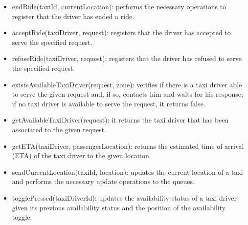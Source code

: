 \begin{itemize}
\begin{itemize}
	\item endRide(taxiId, currentLocation): performs the necessary operations to register that the driver has ended a ride.
	\item acceptRide(taxiDriver, request): registers that the driver has accepted to serve the specified request.
	\item refuseRide(taxiDriver, request): registers that the driver has refused to serve the specified request.
	\item existsAvailableTaxiDriver(request, zone): verifies if there is a taxi driver able to serve the given request and, if so, contacts him and waits for his response; if no taxi driver is available to serve the request, it returns false.
	\item getAvailableTaxiDriver(request): it returns the taxi driver that has been associated to the given request.
	\item getETA(taxiDriver, passengerLocation): returns the estimated time of arrival (ETA) of the taxi driver to the given location.
	\item sendCurrentLocation(taxiId, location): updates the current location of a taxi and performs the necessary update operations to the queues. 
	\item togglePressed(taxiDriverId): updates the availability status of a taxi driver given its previous availability status and the position of the availability toggle.
	\end{itemize}
	\end{itemize}

